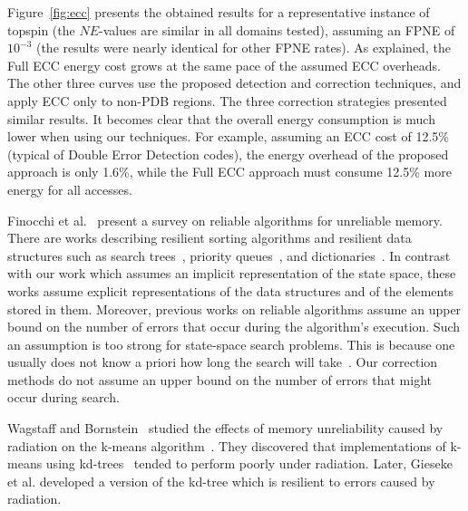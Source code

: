 \documentclass[letterpaper]{article}
\begin{document}
Figure~\ref{fig:ecc} presents the obtained results for a representative instance of topspin (the $NE$-values are similar in all domains tested), assuming an FPNE of $10^{-3}$ (the results were nearly identical for other FPNE rates). As explained, the Full ECC energy cost grows at the same pace of the assumed ECC overheads. The other three curves use the proposed detection and correction techniques, and apply ECC only to non-PDB regions. The three correction strategies presented similar results.  It becomes clear that the overall energy consumption is much lower when using our techniques. For example, assuming an ECC cost of 12.5\% (typical of Double Error Detection codes), the energy overhead of the proposed approach is only 1.6\%, while the Full ECC approach must consume 12.5\% more energy for all accesses.




Finocchi et al.~ present a survey on reliable algorithms for unreliable memory. There are works describing resilient sorting algorithms and resilient data structures such as search trees~\cite{finocchi2007resilient}, priority queues~\cite{jorgensen2007priority}, and dictionaries~\cite{brodal2007optimal}. In contrast with our work which assumes an implicit representation of the state space, these works assume explicit representations of the data structures and of the elements stored in them. Moreover, previous works on reliable algorithms assume an upper bound on the number of errors that occur during the algorithm's execution. Such an assumption is too strong for state-space search problems. This is because one usually does not know a priori how long the search will take~\cite{Knuth75}. Our correction methods do not assume an upper bound on the number of errors that might occur during search.

Wagstaff and Bornstein~ studied the effects of memory unreliability caused by radiation on the k-means algorithm~\cite{mcqueen67}. %
They discovered that implementations of k-means using kd-trees~\cite{Kanetal2002} tended to perform poorly under radiation. Later, Gieseke et al.  developed a version of the kd-tree which is resilient to errors caused by radiation.
\end{document}
